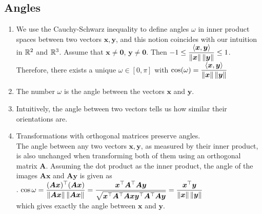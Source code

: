 \subsection{Angles}

\begin{enumerate}
    \item We use the Cauchy-Schwarz inequality to define angles $\omega$ in inner product spaces between two vectors $\bm{x}, \bm{y}$, and this notion coincides with our intuition in $\mathbb{R}^2$ and $\mathbb{R}^3$.
    Assume that $\bm{x} \neq \bm{0}$, $\bm{y} \neq \bm{0}$.
    Then
    $
        -1 \leq \dfrac{\langle\bm{x}, \bm{y}\rangle}{\left\| \bm{x} \right\| \left\| \bm{y} \right\|} \leq 1
    $.
    Therefore, there exists a unique $\omega \in [0, \pi]$ with
    $
        \cos(\omega) = \dfrac{\langle\bm{x}, \bm{y}\rangle}{\left\| \bm{x} \right\| \left\| \bm{y} \right\|}
    $
    \hfill \cite{mfml/book/mml/Deisenroth-Faisal-Ong}

    \item The number $\omega$ is the angle between the vectors $\bm{x}$ and $\bm{y}$.
    \hfill \cite{mfml/book/mml/Deisenroth-Faisal-Ong}

    \item Intuitively, the angle between two vectors tells us how similar their orientations are.
    \hfill \cite{mfml/book/mml/Deisenroth-Faisal-Ong}

    \item Transformations with orthogonal matrices preserve angles.
    \hfill \cite{mfml/book/mml/Deisenroth-Faisal-Ong}
    \\
    The angle between any two vectors $\bm{x}, \bm{y}$, as measured by their inner product, is also unchanged when transforming both of them using an orthogonal matrix $\bm{A}$.
    Assuming the dot product as the inner product, the angle of the images $\bm{Ax}$ and $\bm{Ay}$ is given as
    \hfill \cite{mfml/book/mml/Deisenroth-Faisal-Ong}
    \\
    .\hfill
    $
        \cos \omega
        = \dfrac{(\bm{Ax})^\top (\bm{Ax})}{\left\| \bm{Ax} \right\| \left\| \bm{Ax} \right\|}
        = \dfrac{\bm{x}^\top \bm{A}^\top\bm{Ay}}{\sqrt{\bm{x}^\top \bm{A}^\top\bm{Ax} \bm{y}^\top \bm{A}^\top\bm{Ay}}}
        = \dfrac{\bm{x}^\top \bm{y}}{\left\| \bm{x} \right\| \left\| \bm{y} \right\|}
    $
    \hfill \cite{mfml/book/mml/Deisenroth-Faisal-Ong}
    \\
    which gives exactly the angle between $\bm{x}$ and $\bm{y}$.
\end{enumerate}

